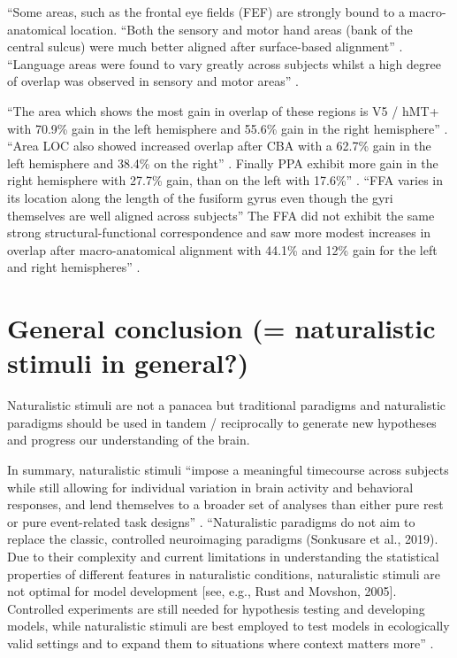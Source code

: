%
``Some areas, such as the frontal eye fields (FEF) are strongly bound to a
macro-anatomical location.
%
``Both the sensory and motor hand areas (bank of the central sulcus) were much
better aligned after surface-based alignment'' \citep{frost2012measuring}.
%
``Language areas were found to vary greatly across subjects whilst a high degree
of overlap was observed in sensory and motor areas'' \citep{frost2012measuring}.

%
``The area which shows the most gain in overlap of these regions is V5 / hMT+
with 70.9\% gain in the left hemisphere and 55.6\% gain in the right
hemisphere'' \citep{frost2012measuring}.
%
``Area LOC also showed increased overlap after CBA with a 62.7\% gain in the
left hemisphere and 38.4\% on the right'' \citep{frost2012measuring}.
%
Finally PPA exhibit more gain in the right hemisphere with 27.7\% gain, than on
the left with 17.6\%'' \citep{frost2012measuring}.
%
``FFA varies in its location along the length of the fusiform gyrus even though
the gyri themselves are well aligned across subjects''
%
The FFA did not exhibit the same strong structural-functional correspondence and
saw more modest increases in overlap after macro-anatomical alignment with
44.1\% and 12\% gain for the left and right hemispheres''
\citep{frost2012measuring}.


\section{General conclusion (= naturalistic stimuli in general?)}
%
Naturalistic stimuli are not a panacea but traditional paradigms and
naturalistic paradigms should be used in tandem / reciprocally to generate new
hypotheses and progress our understanding of the brain.

%
In summary, naturalistic stimuli ``impose a meaningful timecourse across
subjects while still allowing for individual variation in brain activity and
behavioral responses, and lend themselves to a broader set of analyses than
either pure rest or pure event-related task designs'' \citep{finn2017can}.
%
``Naturalistic paradigms do not aim to replace the classic, controlled
neuroimaging paradigms (Sonkusare et al., 2019). Due to their complexity and
current limitations in understanding the statistical properties of different
features in naturalistic conditions, naturalistic stimuli are not optimal for
model development [see, e.g., Rust and Movshon, 2005]. Controlled experiments
are still needed for hypothesis testing and developing models, while
naturalistic stimuli are best employed to test models in ecologically valid
settings and to expand them to situations where context matters
more'' \citep{saarimaki2021naturalistic}.
